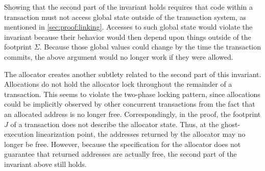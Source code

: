 Showing that the second part of the invariant holds requires that code within a
transaction must not access global state outside of the
transaction system, as mentioned in \cref{sec:proof:linking}. Accesses to such global state
would violate the invariant because their behavior would then depend upon
things outside of the footprint $\Sigma$. Because those global values could change
by the time the transaction commits, the above argument would no longer work if they were allowed.

The allocator creates another subtlety related to the second part of this
invariant. Allocations do not hold the allocator lock throughout the remainder
of a transaction. This seems to violate the two-phase locking pattern, since
allocations could be implicitly observed by other concurrent transactions from
the fact that an allocated address is no longer free. Correspondingly, in the
proof, the footprint $J$ of a transaction does not describe the allocator state.
Thus, at the ghost-execution linearization point, the addresses returned by the
allocator may no longer be free. However, because the specification for the
allocator does not guarantee that returned addresses are actually free, the
second part of the invariant above still holds.


